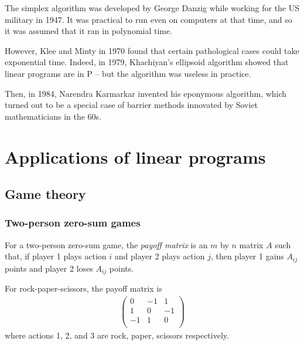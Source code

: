 \documentclass{../template/note}
\begin{document}
    \begin{remark*}
        The simplex algorithm was developed by George Danzig while working for the US military in 1947. It was practical to run even on computers at that time, and so it was assumed that it ran in polynomial time.

        However, Klee and Minty in 1970 found that certain pathological cases could take exponential time. Indeed, in 1979, Khachiyan's ellipsoid algorithm showed that linear programs are in P -- but the algorithm was useless in practice.

        Then, in 1984, Narendra Karmarkar invented his eponymous algorithm, which turned out to be a special case of barrier methods innovated by Soviet mathematicians in the 60s.
    \end{remark*}

    \section{Applications of linear programs}

    \subsection{Game theory}

    \subsubsection{Two-person zero-sum games}

    \begin{definition}
        For a two-person zero-sum game, the \emph{payoff matrix} is an $m$ by $n$ matrix $A$ such that, if player 1 plays action $i$ and player 2 plays action $j$, then player 1 gains $A_{ij}$ points and player 2 loses $A_{ij}$ points.
    \end{definition}
    
    \begin{example*}
        For rock-paper-scissors, the payoff matrix is
        \begin{align*}
            \begin{pmatrix}
                0 & -1 & 1 \\
                1 & 0 & -1 \\
                -1 & 1 & 0 \\
            \end{pmatrix}
        \end{align*}
        where actions 1, 2, and 3 are rock, paper, scissors respectively.        
    \end{example*}
    
\end{document}
